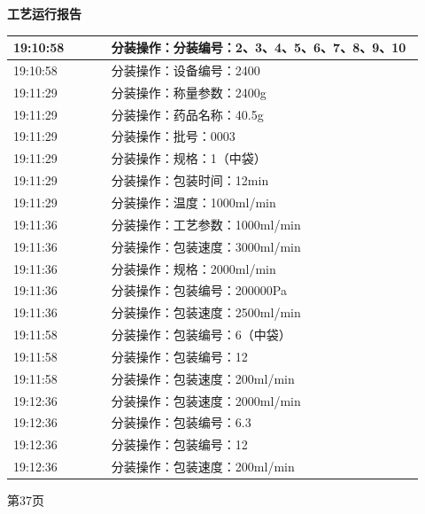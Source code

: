 \documentclass[UTF8,10pt,a4paper,fontset=fandol]{ctexart}
\begin{document}
\newpage

\noindent
\begin{minipage}[t]{0.47\linewidth}
\centering
\textbf{工艺运行报告}

\smallskip
\begin{tabular}{|p{0.22\linewidth}|p{0.70\linewidth}|}
\hline
19:10:58 & 分装操作：分装编号：2、3、4、5、6、7、8、9、10 \\ \hline
19:10:58 & 分装操作：设备编号：2400 \\ \hline
19:11:29 & 分装操作：称量参数：2400g \\ \hline
19:11:29 & 分装操作：药品名称：40.5g \\ \hline
19:11:29 & 分装操作：批号：0003 \\ \hline
19:11:29 & 分装操作：规格：1（中袋） \\ \hline
19:11:29 & 分装操作：包装时间：12min \\ \hline
19:11:29 & 分装操作：温度：1000ml/min \\ \hline
19:11:36 & 分装操作：工艺参数：1000ml/min \\ \hline
19:11:36 & 分装操作：包装速度：3000ml/min \\ \hline
19:11:36 & 分装操作：规格：2000ml/min \\ \hline
19:11:36 & 分装操作：包装编号：200000Pa \\ \hline
19:11:36 & 分装操作：包装速度：2500ml/min \\ \hline
19:11:58 & 分装操作：包装编号：6（中袋） \\ \hline
19:11:58 & 分装操作：包装编号：12 \\ \hline
19:11:58 & 分装操作：包装速度：200ml/min \\ \hline
19:12:36 & 分装操作：包装速度：2000ml/min \\ \hline
19:12:36 & 分装操作：包装编号：6.3 \\ \hline
19:12:36 & 分装操作：包装编号：12 \\ \hline
19:12:36 & 分装操作：包装速度：200ml/min \\ \hline
\end{tabular}

\smallskip
第37页
\end{minipage}
\hfill
\end{document}
